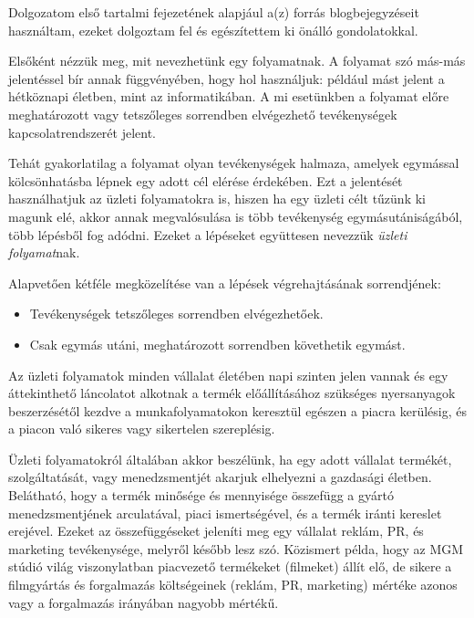 

Dolgozatom első tartalmi fejezetének alapjául a(z) \cite{xflower} forrás blogbejegyzéseit használtam, ezeket dolgoztam fel és egészítettem ki önálló gondolatokkal.


Elsőként nézzük meg, mit nevezhetünk egy folyamatnak. A folyamat szó más-más jelentéssel bír annak függvényében, hogy hol használjuk: például mást jelent a hétköznapi életben, mint az informatikában. A mi esetünkben a folyamat előre meghatározott vagy tetszőleges sorrendben elvégezhető tevékenységek kapcsolatrendszerét jelent.

Tehát gyakorlatilag a folyamat olyan tevékenységek halmaza, amelyek egymással kölcsönhatásba lépnek egy adott cél elérése érdekében. Ezt a jelentését használhatjuk az üzleti folyamatokra is, hiszen ha egy üzleti célt tűzünk ki magunk elé, akkor annak megvalósulása is több tevékenység egymásutániságából, több lépésből fog adódni. Ezeket a lépéseket együttesen nevezzük \textit{üzleti folyamat}nak.

Alapvetően kétféle megközelítése van a lépések végrehajtásának sorrendjének:

\begin{itemize}
\item Tevékenységek tetszőleges sorrendben elvégezhetőek.
\item Csak egymás utáni, meghatározott sorrendben követhetik egymást.
\end{itemize}

Az üzleti folyamatok minden vállalat életében napi szinten jelen vannak és egy áttekinthető láncolatot alkotnak a termék előállításához szükséges nyersanyagok beszerzésétől kezdve a munkafolyamatokon keresztül egészen a piacra kerülésig, és a piacon való sikeres vagy sikertelen szereplésig.

Üzleti folyamatokról általában akkor beszélünk, ha egy adott vállalat termékét, szolgáltatását, vagy menedzsmentjét akarjuk elhelyezni a gazdasági életben. Belátható, hogy a termék minősége és mennyisége összefügg a gyártó menedzsmentjének arculatával, piaci ismertségével, és a termék iránti kereslet erejével. Ezeket az összefüggéseket jeleníti meg egy vállalat reklám, PR, és marketing tevékenysége, melyről később lesz szó. Közismert példa, hogy az MGM stúdió világ viszonylatban piacvezető termékeket (filmeket) állít elő, de sikere a filmgyártás és forgalmazás költségeinek (reklám, PR, marketing) mértéke azonos vagy a forgalmazás irányában nagyobb mértékű.

